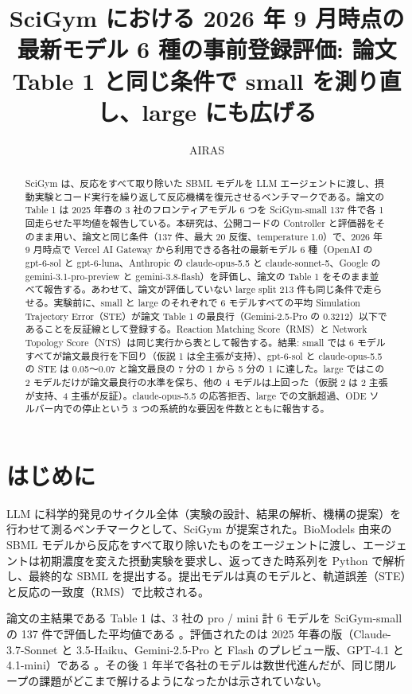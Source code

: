 \documentclass{article}
\title{SciGym における 2026 年 9 月時点の最新モデル 6 種の事前登録評価: 論文 Table 1 と同じ条件で small を測り直し、large にも広げる}
\author{AIRAS}
\begin{document}
\maketitle

\begin{abstract}
SciGym \citep{duan-2025-measuring} は、反応をすべて取り除いた SBML モデルを LLM エージェントに渡し、摂動実験とコード実行を繰り返して反応機構を復元させるベンチマークである。論文の Table 1 は 2025 年春の 3 社のフロンティアモデル 6 つを SciGym-small 137 件で各 1 回走らせた平均値を報告している。本研究は、公開コードの Controller と評価器をそのまま用い、論文と同じ条件（137 件、最大 20 反復、temperature 1.0）で、2026 年 9 月時点で Vercel AI Gateway から利用できる各社の最新モデル 6 種（OpenAI の gpt-6-sol と gpt-6-luna、Anthropic の claude-opus-5.5 と claude-sonnet-5、Google の gemini-3.1-pro-preview と gemini-3.8-flash）を評価し、論文の Table 1 をそのまま並べて報告する。あわせて、論文が評価していない large split 213 件も同じ条件で走らせる。実験前に、small と large のそれぞれで 6 モデルすべての平均 Simulation Trajectory Error（STE）が論文 Table 1 の最良行（Gemini-2.5-Pro の 0.3212）以下であることを反証線として登録する。Reaction Matching Score（RMS）と Network Topology Score（NTS）は同じ実行から表として報告する。結果: small では 6 モデルすべてが論文最良行を下回り（仮説 1 は全主張が支持）、gpt-6-sol と claude-opus-5.5 の STE は 0.05〜0.07 と論文最良の 7 分の 1 から 5 分の 1 に達した。large ではこの 2 モデルだけが論文最良行の水準を保ち、他の 4 モデルは上回った（仮説 2 は 2 主張が支持、4 主張が反証）。claude-opus-5.5 の応答拒否、large での文脈超過、ODE ソルバー内での停止という 3 つの系統的な要因を件数とともに報告する。
\end{abstract}

\section{はじめに}
\label{sec:intro}
LLM に科学的発見のサイクル全体（実験の設計、結果の解析、機構の提案）を行わせて測るベンチマークとして、SciGym \citep{duan-2025-measuring} が提案された。BioModels 由来の SBML モデルから反応をすべて取り除いたものをエージェントに渡し、エージェントは初期濃度を変えた摂動実験を要求し、返ってきた時系列を Python で解析し、最終的な SBML を提出する。提出モデルは真のモデルと、軌道誤差（STE）と反応の一致度（RMS）で比較される。

論文の主結果である Table 1 は、3 社の pro / mini 計 6 モデルを SciGym-small の 137 件で評価した平均値である \cite[s1.p2, s1.p10]{duan-2025-measuring}。評価されたのは 2025 年春の版（Claude-3.7-Sonnet と 3.5-Haiku、Gemini-2.5-Pro と Flash のプレビュー版、GPT-4.1 と 4.1-mini）である \cite[s1.p1]{duan-2025-measuring}。その後 1 年半で各社のモデルは数世代進んだが、同じ閉ループの課題がどこまで解けるようになったかは示されていない。
\end{document}
